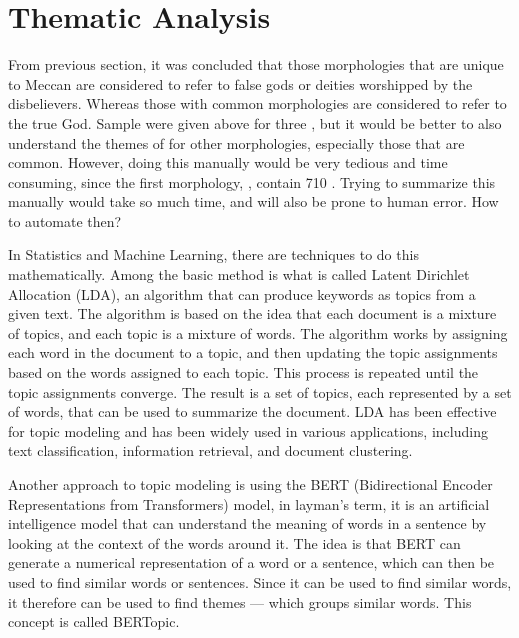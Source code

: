 


\section{Thematic Analysis}\label{sec:result_thematic_analysis}
From previous section, it was concluded that those morphologies that are unique to Meccan   are considered to refer to false gods or deities worshipped by the disbelievers. Whereas those with common morphologies are considered to refer to the true God. Sample   were given above for three  , but it would be better to also understand the themes of   for other morphologies, especially those that are common. However, doing this manually would be very tedious and time consuming, since the first morphology,  , contain 710  . Trying to summarize this manually would take so much time, and will also be prone to human error. How to automate then?

In Statistics and Machine Learning, there are techniques to do this mathematically. Among the basic method is what is called Latent Dirichlet Allocation (LDA), an algorithm that can produce keywords as topics from a given text. The algorithm is based on the idea that each document is a mixture of topics, and each topic is a mixture of words. The algorithm works by assigning each word in the document to a topic, and then updating the topic assignments based on the words assigned to each topic. This process is repeated until the topic assignments converge. The result is a set of topics, each represented by a set of words, that can be used to summarize the document. LDA has been effective for topic modeling and has been widely used in various applications, including text classification, information retrieval, and document clustering.

Another approach to topic modeling is using the BERT (Bidirectional Encoder Representations from Transformers) model, in layman's term, it is an artificial intelligence model that can understand the meaning of words in a sentence by looking at the context of the words around it. The idea is that BERT can generate a numerical representation of a word or a sentence, which can then be used to find similar words or sentences. Since it can be used to find similar words, it therefore can be used to find themes --- which groups similar words. This concept is called BERTopic. 

